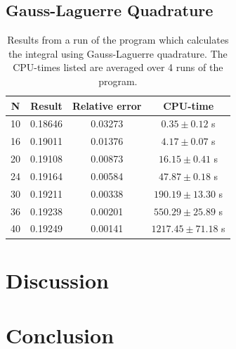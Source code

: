 \documentclass[twoside, 11pt]{article}
\begin{document}
	\subsection{Gauss-Laguerre Quadrature}
		\begin{table}[H]
			\centering
			\caption{Results from a run of the program which calculates the integral using Gauss-Laguerre quadrature. The CPU-times listed are averaged over 4 runs of the program.}
			\label{table: results gauss-laguerre}
			\begin{tabular}{|c|c|c|c|}
\hline
\textbf{N} 	&	\textbf{Result}	&	\textbf{Relative error}	&	\textbf{CPU-time} \\ \hline 
10 	&	0.18646	&	0.03273			&	$0.35 \pm 0.12$ s	\\ \hline
16 	&	0.19011	&	0.01376			&	$4.17 \pm 0.07$ s	\\ \hline
20 	&	0.19108	&	0.00873			&	$16.15 \pm 0.41$ s	\\ \hline
24 	&	0.19164	&	0.00584			&	$47.87 \pm 0.18$ s	\\ \hline
30 	&	0.19211	&	0.00338			&	$190.19 \pm 13.30$ s	\\ \hline
36 	&	0.19238	&	0.00201			&	$550.29 \pm 25.89$ s	\\ \hline
40 	&	0.19249	&	0.00141			&	$1217.45 \pm 71.18$ s	\\ \hline	
			\end{tabular}
		\end{table}
	




\section{Discussion}

\section{Conclusion}


%
%


\end{document}
